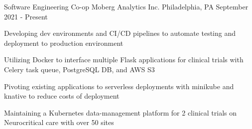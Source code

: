 

\begin{cventries}

  
	\cventry
	{Software Engineering Co-op}
	{Moberg Analytics Inc.}
	{Philadelphia, PA}
	{September 2021 - Present}
	{\begin{cvitems}
		\item {Developing dev environments and CI/CD pipelines to automate testing and deployment to production environment}
		\item {Utilizing Docker to interface multiple Flask applications for clinical trials with Celery task queue, PostgreSQL DB, and AWS S3}
		\item {Pivoting existing applications to serverless deployments with minikube and knative to reduce costs of deployment}
		\item {Maintaining a Kubernetes data-management platform for 2 clinical trials on Neurocritical care with over 50 sites}
		\end{cvitems}}
	


\end{cventries}

